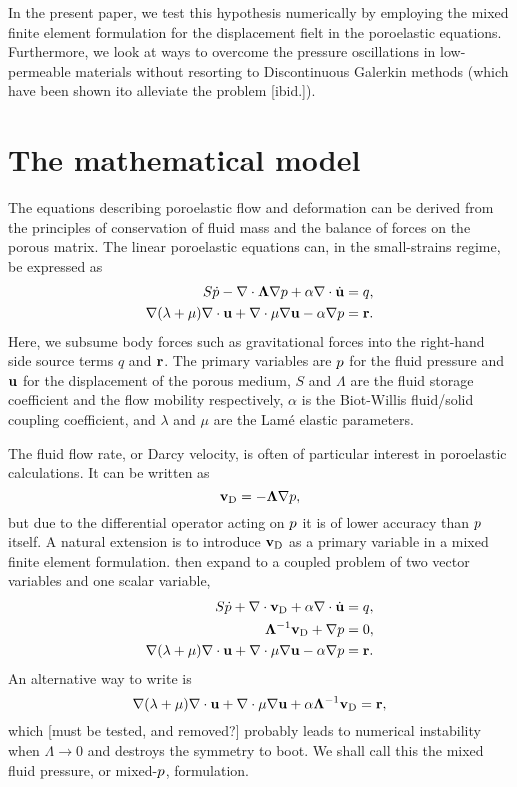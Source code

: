 In the present paper, we test this hypothesis numerically by employing the
mixed finite element formulation for the displacement fielt in the poroelastic
equations.
Furthermore, we look at ways to overcome the pressure oscillations in
low-permeable materials without resorting to Discontinuous Galerkin methods
(which have been shown ito alleviate the problem [ibid.]).

\section{The mathematical model}

The equations describing poroelastic flow and deformation can be derived from
the principles of conservation of fluid mass and the balance of forces on the
porous matrix.
%
The linear poroelastic equations can, in the small-strains regime, be
expressed as
%
\begin{align}
\label{eq:sim1}
S\dot{\Pf} - \nabla \cdot \Lambda \nabla \Pf + \alpha \nabla \cdot \dot{\U} &= q, \\
\label{eq:sim2}
\nabla (\lambda+\mu) \nabla \cdot \U + \nabla \cdot \mu \nabla \U
 -  \alpha \nabla \Pf &= \V{r}.
\end{align}
%
Here, we subsume body forces such as gravitational forces into the right-hand
side source terms $q$ and $\mathbf{r}$.
The primary variables are $p$ for the fluid pressure and $\mathbf{u}$ for the
displacement of the porous medium, $S$ and $\Lambda$ are the fluid storage
coefficient and the flow mobility respectively, $\alpha$ is the Biot-Willis fluid/solid
coupling coefficient, and $\lambda$ and $\mu$ are the Lam\'e elastic parameters.

The fluid flow rate, or Darcy velocity, is often of particular interest in
poroelastic calculations.
It can be written as
\begin{equation}
  \vD= -\Lambda \nabla \Pf,
\end{equation}
but due to the differential operator acting on $p$ it is of lower accuracy than
$p$ itself.
A natural extension is to introduce $\mathbf{v}_{\text{D}}$ as a primary variable in a mixed
finite element formulation.
 then expand to a coupled problem of two vector variables and one scalar
variable,
\begin{align}
\label{eq:simp1}
S\dot{\Pf} + \nabla \cdot \vD + \alpha \nabla \cdot \dot{\U} &= q, \\
\label{eq:simp2}
  \Lambda^{-1} \vD + \nabla \Pf &= 0,\\
\label{eq:simp3}
\nabla (\lambda+\mu) \nabla \cdot \U + \nabla \cdot \mu \nabla \U
 -  \alpha \nabla \Pf &= \V{r}.
\end{align}
An alternative way to write  is
\begin{equation}
\nabla (\lambda+\mu) \nabla \cdot \U + \nabla \cdot \mu \nabla \U
 +  \alpha \Lambda^{-1}\vD = \V{r},
\end{equation}
which [must be tested, and removed?] probably leads to numerical instability
when $\Lambda\rightarrow 0$ and destroys the symmetry to boot.
We shall call this the mixed fluid pressure, or mixed-$p$, formulation.

